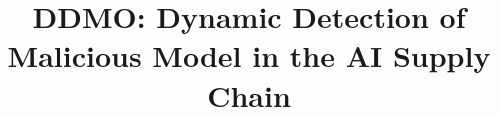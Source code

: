 \documentclass[conference,compsoc]{IEEEtran}
\begin{document}
%
\title{DDMO: Dynamic Detection of Malicious Model in the AI Supply Chain}




% 
\end{document}
